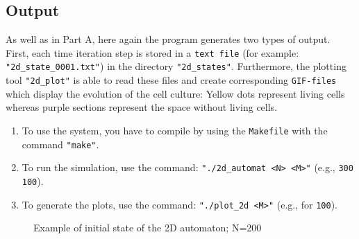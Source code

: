 \documentclass[12pt,a4paper]{article}
\begin{document}
\newpage

\subsection{Output}
As well as in Part A, here again the program generates two types of output.
First, each time iteration step is stored in a \texttt{text file} (for example: \texttt{"2d\_state\_0001.txt"}) in
the directory \texttt{"2d\_states"}.
\newline
Furthermore, the plotting tool \texttt{"2d\_plot"} is able to read these files and create
corresponding \texttt{GIF-files} which display the evolution of the cell culture: Yellow dots
represent living cells whereas purple sections represent the space without living cells.
\newline

\vspace{0.1cm}

\begin{enumerate}[label=\roman*.]
    \item 
    To use the system, you have to compile by using the \texttt{Makefile} with the command \texttt{"make"}.
    \newline
    \vspace{0.1 cm}

    \item 
    To run the simulation, use the command: \texttt{"./2d\_automat <N> <M>"} (e.g., \texttt{300 100}).
    \newline
    \vspace{0.1 cm}

    \item 
    To generate the plots, use the command: \texttt{"./plot\_2d <M>"} (e.g., for \texttt{100}).
\end{enumerate}

\vspace{0.5cm}

\begin{figure}[H]
    \centering
    \caption{\small Example of initial state of the 2D automaton; N=200}
    \label{fig:your_label}
\end{figure}
\end{document}
